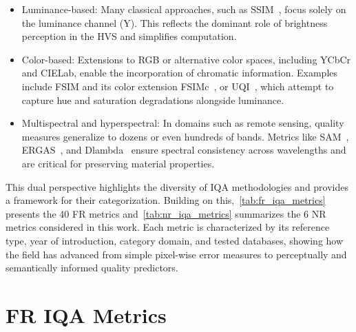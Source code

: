 \begin{itemize}
  \item Luminance-based: Many classical approaches, such as \acf{SSIM}~\cite{wang2004image}, focus solely on the luminance channel (Y). This reflects the dominant role of brightness perception in the \acs{HVS} and simplifies computation.
  \item Color-based: Extensions to RGB or alternative color spaces, including YCbCr and CIELab, enable the incorporation of chromatic information. Examples include \acf{FSIM} and its color extension \acf{FSIMc}~\cite{zhang2011fsim}, or \acf{UQI}~\cite{wang2002uqi}, which attempt to capture hue and saturation degradations alongside luminance.
  \item Multispectral and hyperspectral: In domains such as remote sensing, quality measures generalize to dozens or even hundreds of bands. Metrics like \acf{SAM}~\cite{yuhas1992sam}, \acf{ERGAS}~\cite{wald2000ergas}, and \acf{Dlambda}~\cite{ivc} ensure spectral consistency across wavelengths and are critical for preserving material properties.
\end{itemize}

This dual perspective highlights the diversity of \acs{IQA} methodologies and provides a framework for their categorization. Building on this,~\autoref{tab:fr_iqa_metrics} presents the 40 \acs{FR} metrics and~\autoref{tab:nr_iqa_metrics} summarizes the 6 \acs{NR} metrics considered in this work. Each metric is characterized by its reference type, year of introduction, category domain, and tested databases, showing how the field has advanced from simple pixel-wise error measures to perceptually and semantically informed quality predictors.

\section{\acl{FR} \acs{IQA} Metrics}\label{sec:full_reference_iqa}

